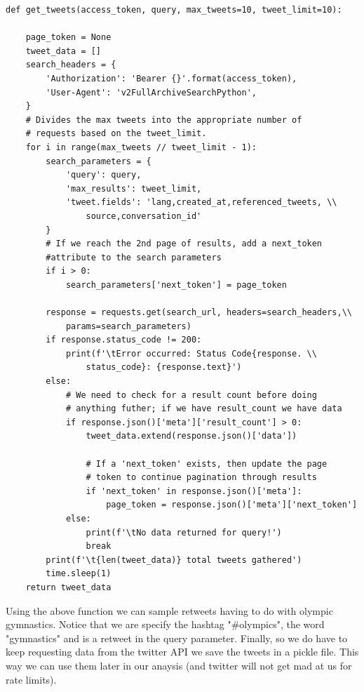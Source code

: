 \documentclass[12pt]{article}
\begin{document}
            \begin{lstlisting}[caption=Tweet Generator]
def get_tweets(access_token, query, max_tweets=10, tweet_limit=10):

    page_token = None
    tweet_data = []
    search_headers = {
        'Authorization': 'Bearer {}'.format(access_token),
        'User-Agent': 'v2FullArchiveSearchPython',
    }
    # Divides the max tweets into the appropriate number of 
    # requests based on the tweet_limit.
    for i in range(max_tweets // tweet_limit - 1):
        search_parameters = {
            'query': query,
            'max_results': tweet_limit,
            'tweet.fields': 'lang,created_at,referenced_tweets, \\
                source,conversation_id'
        }
        # If we reach the 2nd page of results, add a next_token 
        #attribute to the search parameters
        if i > 0:
            search_parameters['next_token'] = page_token

        response = requests.get(search_url, headers=search_headers,\\
            params=search_parameters)
        if response.status_code != 200:
            print(f'\tError occurred: Status Code{response. \\
                status_code}: {response.text}')
        else:
            # We need to check for a result count before doing 
            # anything futher; if we have result_count we have data
            if response.json()['meta']['result_count'] > 0:
                tweet_data.extend(response.json()['data'])
                
                # If a 'next_token' exists, then update the page 
                # token to continue pagination through results
                if 'next_token' in response.json()['meta']:
                    page_token = response.json()['meta']['next_token']
            else:
                print(f'\tNo data returned for query!')
                break        
        print(f'\t{len(tweet_data)} total tweets gathered')
        time.sleep(1)
    return tweet_data
            \end{lstlisting}

            Using the above function we can sample retweets having to do with olympic gymnastics. Notice that we are specify the hashtag "\#olympics", the word "gymnastics" and is a 
            retweet in the query parameter. Finally, so we do have to keep requesting data from the twitter API we save the tweets in a pickle file. This way we can use them later in 
            our anaysis (and twitter will not get mad at us for rate limits).\\
            
\end{document}
